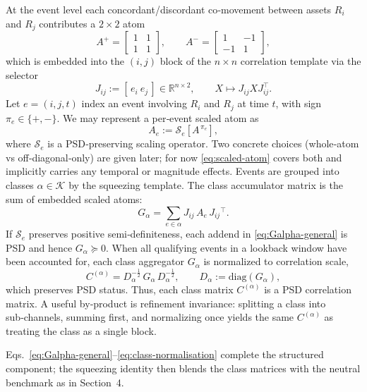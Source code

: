 \documentclass[12pt,letterpaper]{article}
\begin{document}
At the event level each concordant/discordant co‑movement between assets $R_i$ and $R_j$ contributes a $2\times2$ atom
\begin{equation}
A^{+}=\begin{bmatrix}1&1\\[2pt]1&1\end{bmatrix},\qquad
A^{-}=\begin{bmatrix}1&-1\\[2pt]-1&1\end{bmatrix},
\label{eq:atoms}
\end{equation}
which is embedded into the $(i,j)$ block of the $n \times n$ correlation template via the selector
\[
J_{ij} := [\,e_i\ e_j\,]\in\mathbb{R}^{n\times 2},\qquad X \mapsto J_{ij} X J_{ij}^\top.
\]
Let $e=(i,j,t)$ index an event involving $R_i$ and $R_j$ at time $t$, with sign $\pi_e\in\{+,-\}$. We may represent a per‑event scaled atom as
\begin{equation}
{A}_e := \mathcal{S}_e\!\left[A^{\,\pi_e}\right],
\label{eq:scaled-atom}
\end{equation}
where $\mathcal{S}_e$ is a PSD‑preserving scaling operator. Two concrete choices (whole‑atom vs off‑diagonal‑only) are given later; for now \eqref{eq:scaled-atom} covers both and implicitly carries any temporal or magnitude effects. Events are grouped into classes $\alpha \in \mathcal{K}$ by the squeezing template. The class accumulator matrix is the sum of embedded scaled atoms:
\begin{equation}
G_\alpha = \sum_{e\in\alpha} J_{ij}\,{A}_e\,J^{\phantom{\top}}_{ij}{}^\top.
\label{eq:Galpha-general}
\end{equation}
If $\mathcal{S}_e$ preserves positive semi‑definiteness, each addend in \eqref{eq:Galpha-general} is PSD and hence $G_\alpha\succeq0$. When all qualifying events in a lookback window have been accounted for, each class aggregator $G_\alpha$ is normalized to correlation scale,
\begin{equation}
C^{(\alpha)} = D_\alpha^{-\tfrac12}\,G_\alpha\,D_\alpha^{-\tfrac12},
\qquad D_\alpha:=\mathrm{diag}(G_\alpha),
\label{eq:class-normalisation}
\end{equation}
which preserves PSD status. Thus, each class matrix $C^{(\alpha)}$ is a PSD correlation matrix. A useful by‑product is refinement invariance: splitting a class into sub‑channels, summing first, and normalizing once yields the same $C^{(\alpha)}$ as treating the class as a single block.

\medskip\noindent
Eqs.~\eqref{eq:Galpha-general}–\eqref{eq:class-normalisation} complete the structured component; the squeezing identity then blends the class matrices with the neutral benchmark as in Section~4.
\end{document}
